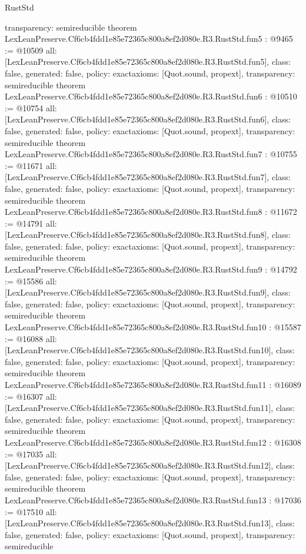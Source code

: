 \begin{lexlean}{RustStd}
\begin{coremodule}
{  transparency: semireducible
}
theorem LexLeanPreserve.Cf6cb4fdd1e85e72365c800a8ef2d080e.R3.RustStd.fun5 : @9465 := @10509 {
  all: [LexLeanPreserve.Cf6cb4fdd1e85e72365c800a8ef2d080e.R3.RustStd.fun5],
  class: false,
  generated: false,
  policy: exact{axioms: [Quot.sound, propext]},
  transparency: semireducible
}
theorem LexLeanPreserve.Cf6cb4fdd1e85e72365c800a8ef2d080e.R3.RustStd.fun6 : @10510 := @10754 {
  all: [LexLeanPreserve.Cf6cb4fdd1e85e72365c800a8ef2d080e.R3.RustStd.fun6],
  class: false,
  generated: false,
  policy: exact{axioms: [Quot.sound, propext]},
  transparency: semireducible
}
theorem LexLeanPreserve.Cf6cb4fdd1e85e72365c800a8ef2d080e.R3.RustStd.fun7 : @10755 := @11671 {
  all: [LexLeanPreserve.Cf6cb4fdd1e85e72365c800a8ef2d080e.R3.RustStd.fun7],
  class: false,
  generated: false,
  policy: exact{axioms: [Quot.sound, propext]},
  transparency: semireducible
}
theorem LexLeanPreserve.Cf6cb4fdd1e85e72365c800a8ef2d080e.R3.RustStd.fun8 : @11672 := @14791 {
  all: [LexLeanPreserve.Cf6cb4fdd1e85e72365c800a8ef2d080e.R3.RustStd.fun8],
  class: false,
  generated: false,
  policy: exact{axioms: [Quot.sound, propext]},
  transparency: semireducible
}
theorem LexLeanPreserve.Cf6cb4fdd1e85e72365c800a8ef2d080e.R3.RustStd.fun9 : @14792 := @15586 {
  all: [LexLeanPreserve.Cf6cb4fdd1e85e72365c800a8ef2d080e.R3.RustStd.fun9],
  class: false,
  generated: false,
  policy: exact{axioms: [Quot.sound, propext]},
  transparency: semireducible
}
theorem LexLeanPreserve.Cf6cb4fdd1e85e72365c800a8ef2d080e.R3.RustStd.fun10 : @15587 := @16088 {
  all: [LexLeanPreserve.Cf6cb4fdd1e85e72365c800a8ef2d080e.R3.RustStd.fun10],
  class: false,
  generated: false,
  policy: exact{axioms: [Quot.sound, propext]},
  transparency: semireducible
}
theorem LexLeanPreserve.Cf6cb4fdd1e85e72365c800a8ef2d080e.R3.RustStd.fun11 : @16089 := @16307 {
  all: [LexLeanPreserve.Cf6cb4fdd1e85e72365c800a8ef2d080e.R3.RustStd.fun11],
  class: false,
  generated: false,
  policy: exact{axioms: [Quot.sound, propext]},
  transparency: semireducible
}
theorem LexLeanPreserve.Cf6cb4fdd1e85e72365c800a8ef2d080e.R3.RustStd.fun12 : @16308 := @17035 {
  all: [LexLeanPreserve.Cf6cb4fdd1e85e72365c800a8ef2d080e.R3.RustStd.fun12],
  class: false,
  generated: false,
  policy: exact{axioms: [Quot.sound, propext]},
  transparency: semireducible
}
theorem LexLeanPreserve.Cf6cb4fdd1e85e72365c800a8ef2d080e.R3.RustStd.fun13 : @17036 := @17510 {
  all: [LexLeanPreserve.Cf6cb4fdd1e85e72365c800a8ef2d080e.R3.RustStd.fun13],
  class: false,
  generated: false,
  policy: exact{axioms: [Quot.sound, propext]},
  transparency: semireducible
}
\end{coremodule}
\end{lexlean}
